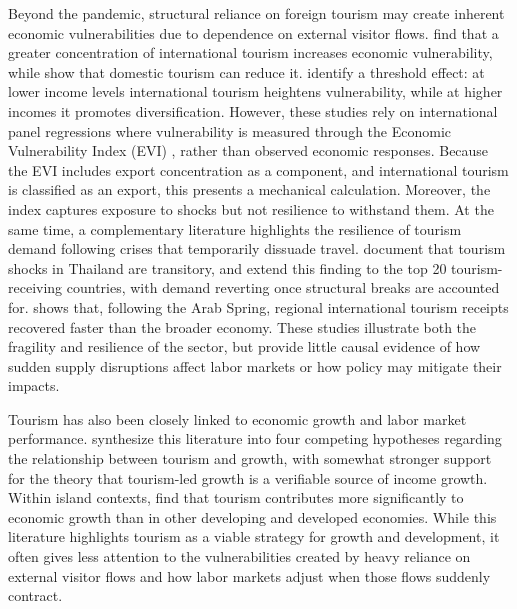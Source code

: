 \documentclass[12pt]{article}
\begin{document}
Beyond the pandemic, structural reliance on foreign tourism may create inherent economic vulnerabilities due to dependence on external visitor flows. \citet{nguyen_2021_the} find that a greater concentration of international tourism increases economic vulnerability, while \citet{canh_2020_domestic} show that domestic tourism can reduce it. \citet{wang_2022_international} identify a threshold effect: at lower income levels international tourism heightens vulnerability, while at higher incomes it promotes diversification. However, these studies rely on international panel regressions where vulnerability is measured through the Economic Vulnerability Index (EVI) \citep{feindouno_2016_the}, rather than observed economic responses. Because the EVI includes export concentration as a component, and international tourism is classified as an export, this presents a mechanical calculation. Moreover, the index captures exposure to shocks but not resilience to withstand them. At the same time, a complementary literature highlights the resilience of tourism demand following crises that temporarily dissuade travel. \citet{saleh_2011_do} document that tourism shocks in Thailand are transitory, and \citet{yucel_2020_are} extend this finding to the top 20 tourism-receiving countries, with demand reverting once structural breaks are accounted for. \citet{morakabati_2019_a} shows that, following the Arab Spring, regional international tourism receipts recovered faster than the broader economy. These studies illustrate both the fragility and resilience of the sector, but provide little causal evidence of how sudden supply disruptions affect labor markets or how policy may mitigate their impacts.

Tourism has also been closely linked to economic growth and labor market performance. \citet{gwenhure_2017_tourism} synthesize this literature into four competing hypotheses regarding the relationship between tourism and growth, with somewhat stronger support for the theory that tourism-led growth is a verifiable source of income growth. Within island contexts, \citet{seetanah_2011_assessing} find that tourism contributes more significantly to economic growth than in other developing and developed economies. While this literature highlights tourism as a viable strategy for growth and development, it often gives less attention to the vulnerabilities created by heavy reliance on external visitor flows and how labor markets adjust when those flows suddenly contract.
\end{document}
